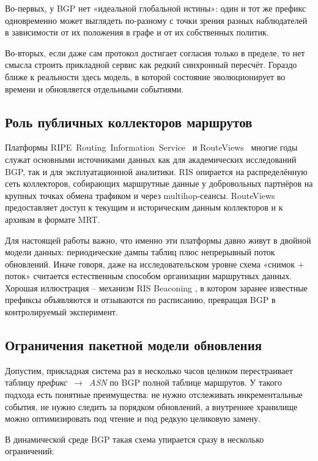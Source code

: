 Во-первых, у BGP нет «идеальной глобальной истины»: один и тот же
префикс одновременно может выглядеть по-разному с точки зрения разных
наблюдателей в зависимости от их положения в графе и от их собственных
политик.

Во-вторых, если даже сам протокол достигает согласия только в пределе,
то нет смысла строить прикладной сервис как редкий синхронный
пересчёт. Гораздо ближе к реальности здесь модель, в которой состояние
эволюционирует во времени и обновляется отдельными событиями.

\subsection{Роль публичных коллекторов маршрутов}

Платформы RIPE~Routing~Information~Service~\cite{ripe-ris} и
RouteViews~\cite{routeviews} многие годы служат основными источниками
данных как для академических исследований BGP, так и для
эксплуатационной аналитики. RIS опирается на распределённую сеть
коллекторов, собирающих маршрутные данные у добровольных партнёров на
крупных точках обмена трафиком и через multihop-сеансы. RouteViews
предоставляет доступ к текущим и историческим данным коллекторов и к
архивам в формате MRT.

Для настоящей работы важно, что именно эти платформы давно живут в
двойной модели данных: периодические дампы таблиц плюс непрерывный
поток обновлений. Иначе говоря, даже на исследовательском уровне
схема «снимок + поток» считается естественным способом организации
маршрутных данных. Хорошая иллюстрация -- механизм RIS Beaconing
\cite{ripe-beacons}, в котором заранее известные префиксы объявляются
и отзываются по расписанию, превращая BGP в контролируемый
эксперимент.

\subsection{Ограничения пакетной модели обновления}

Допустим, прикладная система раз в несколько часов целиком
перестраивает таблицу \textit{префикс~$\rightarrow$~ASN} по BGP
полной таблице маршрутов. У такого подхода есть понятные преимущества:
не нужно
отслеживать инкрементальные события, не нужно следить за порядком
обновлений, а внутреннее хранилище можно оптимизировать под чтение и
под редкую целиковую замену.

В динамической среде BGP такая схема упирается сразу в несколько
ограничений:


